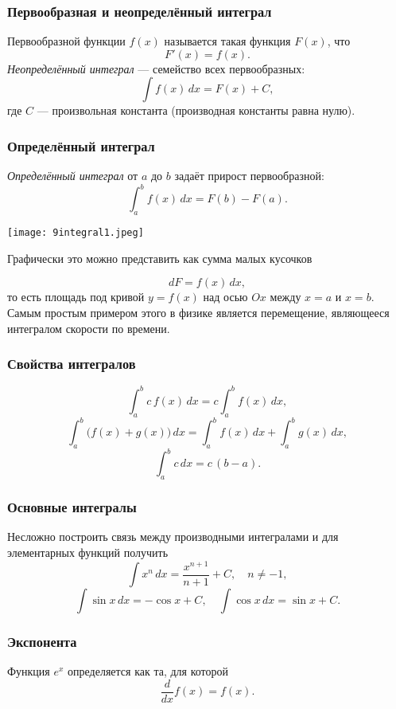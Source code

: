 \documentclass[12pt, a4paper]{article}%
\begin{document}
\subsubsection*{Первообразная и неопределённый интеграл}
Первообразной функции $f(x)$ называется такая функция $F(x)$, что
\[
F'(x)=f(x).
\]
\emph{Неопределённый интеграл} — семейство всех первообразных:
\[
\int f(x)\,dx = F(x) + C,
\]
где $C$ — произвольная константа (производная константы равна нулю).

\subsubsection*{Определённый интеграл}
\emph{Определённый интеграл} от $a$ до $b$ задаёт прирост первообразной:
\[
\int_{a}^{b} f(x)\,dx = F(b) - F(a).
\]


\begin{center}
\texttt{[image: 9integral1.jpeg]}
\label{fig:mpr}
\end{center}

Графически это можно представить как сумма малых кусочков 

\[ 
dF = f(x)\,dx,
\]
то есть площадь под кривой $y=f(x)$ над осью $Ox$ между $x=a$ и $x=b$. Самым простым примером этого в физике является перемещение, являющееся интегралом скорости по времени.



\subsubsection*{Свойства интегралов}
\[
\int_a^b c\,f(x)\,dx = c\int_a^b f(x)\,dx,
\]
\[
\int_{a}^{b} \bigl(f(x)+g(x)\bigr)\,dx = \int_{a}^{b} f(x)\,dx + \int_{a}^{b} g(x)\,dx,
\]
\[
\int_{a}^{b} c\,dx = c\,(b-a).
\]

\subsubsection*{Основные интегралы}
Несложно построить связь между производными интегралами и для элементарных функций получить 
\[
\int x^n\,dx = \frac{x^{n+1}}{n+1} + C,\quad n\neq -1,
\]
\[
\int \sin x\,dx = -\cos x + C,\quad
\int \cos x\,dx = \sin x + C.
\]

\subsubsection*{Экспонента}
Функция $e^x$ определяется как та, для которой
\[
\frac{d}{dx}f(x) = f(x).
\]
\end{document}
